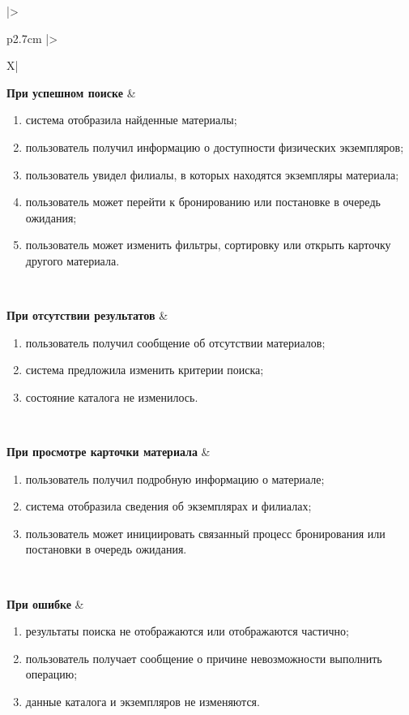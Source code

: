 \documentclass[12pt,a4paper]{article}
\begin{document}
\begin{xltabular}{\textwidth}{
			|>{\raggedright\arraybackslash}p{2.7cm}
			|>{\raggedright\arraybackslash}X|
		}
		\textbf{При успешном поиске} &
		\begin{enumerate}
			\item система отобразила найденные материалы;
			\item пользователь получил информацию о доступности физических
			экземпляров;
			\item пользователь увидел филиалы, в которых находятся экземпляры
			материала;
			\item пользователь может перейти к бронированию или постановке в
			очередь ожидания;
			\item пользователь может изменить фильтры, сортировку или открыть
			карточку другого материала.
		\end{enumerate} \\
		\hline
		
		\textbf{При отсутствии результатов} &
		\begin{enumerate}
			\item пользователь получил сообщение об отсутствии материалов;
			\item система предложила изменить критерии поиска;
			\item состояние каталога не изменилось.
		\end{enumerate} \\
		\hline
		
		\textbf{При просмотре карточки материала} &
		\begin{enumerate}
			\item пользователь получил подробную информацию о материале;
			\item система отобразила сведения об экземплярах и филиалах;
			\item пользователь может инициировать связанный процесс
			бронирования или постановки в очередь ожидания.
		\end{enumerate} \\
		\hline
		
		\textbf{При ошибке} &
		\begin{enumerate}
			\item результаты поиска не отображаются или отображаются частично;
			\item пользователь получает сообщение о причине невозможности
			выполнить операцию;
			\item данные каталога и экземпляров не изменяются.
		\end{enumerate} \\
		\hline
		
		\end{xltabular}
		
\end{document}
